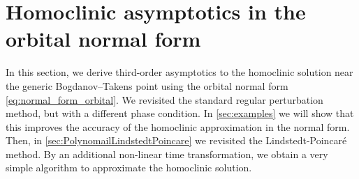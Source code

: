 \section{Homoclinic asymptotics in the orbital normal form}
\label{sec:asymptotics}

In this section, we derive third-order asymptotics to the homoclinic solution
near the generic Bogdanov--Takens point using the orbital normal form \cref{eq:normal_form_orbital}. We revisited the standard regular
perturbation method, but with a different phase condition. In
\cref{sec:examples} we will show that this improves the accuracy of the
homoclinic approximation in the normal form. Then, in
\cref{sec:PolynomailLindstedtPoincare} we revisited the Lindstedt-Poincar\'e
method. By an additional non-linear time transformation, we obtain a very simple
algorithm to approximate the homoclinic solution.

